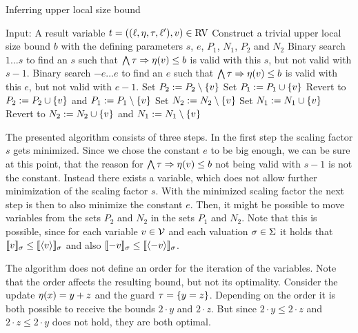 \begin{algorithm}
\caption{Inferring upper local size bound}\label{ulsb_algorithm}
\begin{algorithmic}[1]
  \State Input: A result variable $t = ((\ell,\eta,\tau,\ell'),v) \in \text{RV}$
  \State Construct a trivial upper local size bound $b$ with the defining parameters $s$, $e$, $P_1$, $N_1$, $P_2$ and $N_2$
  \State Binary search $1 \dots s$ to find an $s$ such that $\bigwedge \tau \Rightarrow \eta(v) \leq b$ is valid with this $s$, but not valid with $s-1$.
  \State Binary search $-e \dots e$ to find an $e$ such that $\bigwedge \tau \Rightarrow \eta(v) \leq b$ is valid with this $e$, but not valid with $e-1$.
    \State Set $P_2 := P_2 \setminus \lbrace v \rbrace$
      \State Set $P_1 := P_1 \cup \lbrace v \rbrace$
        \State Revert to $P_2 := P_2 \cup \lbrace v \rbrace$ and $P_1 := P_1 \setminus \lbrace v \rbrace$
      \EndIf
    \EndIf
    \State Set $N_2 := N_2 \setminus \lbrace v \rbrace$
      \State Set $N_1 := N_1 \cup \lbrace v \rbrace$
        \State Revert to $N_2 := N_2 \cup \lbrace v \rbrace$ and $N_1 := N_1 \setminus \lbrace v \rbrace$
      \EndIf
    \EndIf
  \EndFor
\end{algorithmic}
\end{algorithm}

The presented algorithm consists of three steps.
In the first step the scaling factor $s$ gets minimized.
Since we chose the constant $e$ to be big enough, we can be sure at this point, that the reason for $\bigwedge \tau \Rightarrow \eta(v) \leq b$ not being valid with $s-1$ is not the constant.
Instead there exists a variable, which does not allow further minimization of the scaling factor $s$.
With the minimized scaling factor the next step is then to also minimize the constant $e$.
Then, it might be possible to move variables from the sets $P_2$ and $N_2$ in the sets $P_1$ and $N_2$.
Note that this is possible, since for each variable $v \in \mathcal{V}$ and each valuation $\sigma \in \Sigma$ it holds that $\llbracket v \rrbracket_{\sigma} \leq \llbracket \langle v\rangle \rrbracket_{\sigma}$ and also $\llbracket -v \rrbracket_{\sigma} \leq \llbracket \langle-v\rangle \rrbracket_{\sigma}$.

The algorithm does not define an order for the iteration of the variables.
Note that the order affects the resulting bound, but not its optimality.
Consider the update $\eta(x) = y + z$ and the guard $\tau = \lbrace y = z \rbrace$.
Depending on the order it is both possible to receive the bounds $2 \cdot y$ and $2 \cdot z$.
But since $2 \cdot y \leq 2 \cdot z$ and $2 \cdot z \leq 2 \cdot y$ does not hold, they are both optimal.

